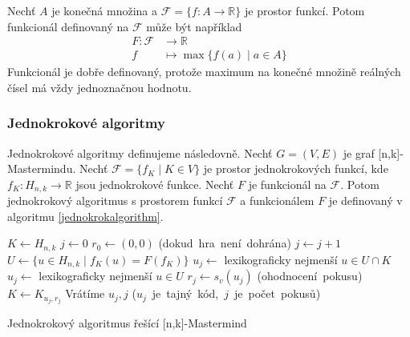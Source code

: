 \begin{prikl}\label{prfunkcional}
    Nechť $A$ je konečná množina a $\mathcal{F} = \{f\colon A \to \mathbb{R}\}$ je prostor funkcí. Potom funkcionál definovaný na $\mathcal{F}$ může být například
    \begin{align*}
        F \colon \mathcal{F} &\to \mathbb{R} \\
        f &\mapsto \max\{f(a) \mid a\in A\}
    \end{align*}
    Funkcionál je dobře definovaný, protože maximum na konečné množině reálných čísel má vždy jednoznačnou hodnotu.
\end{prikl}



\subsubsection{Jednokrokové algoritmy}
Jednokrokové algoritmy definujeme následovně. Nechť $G = (V,E)$ je graf [n,k]-Mastermindu.
Nechť $\mathcal{F} = \{f_K \mid K \in V \} $ je prostor jednokrokových funkcí, kde $f_K \colon H_{n,k} \to \mathbb{R}$ jsou jednokrokové funkce. Nechť $F$ je funkcionál na $\mathcal{F}$. Potom jednokrokový algoritmus s prostorem funkcí $\mathcal{F}$ a funkcionálem $F$ je definovaný v algoritmu \ref{jednokrokalgorithm}. 






\begin{algorithm}[h!]
\begin{algorithmic}[1]  %
    \State $K \gets H_{n,k}$ 
    \State $j \gets 0$
    \State $r_0 \gets (0,0)$
     \hfill \mbox{(dokud hra není dohrána)}
        \State $j \gets j + 1$ 
	\State $U \gets \{u \in H_{n,k} \mid f_K(u) = F(f_K)\}$
            \State $u_j \gets$ lexikograficky nejmenší $u \in U \cap K$
	\Else
		\State $u_j \gets$ lexikograficky nejmenší $u \in U$
	\EndIf
        \State $r_j \gets s_v(u_j)$ \hfill \mbox{(ohodnocení pokusu)}
        \State $K \gets K_{u_j,r_j}$
    \EndWhile
    \State Vrátíme $u_j, j$ \hfill \mbox{($u_j$ je tajný kód, $j$ je počet pokusů)}
\EndFunction
\end{algorithmic}
\caption{Jednokrokový algoritmus řešící [n,k]-Mastermind}
\label{jednokrokalgorithm}
\end{algorithm}

